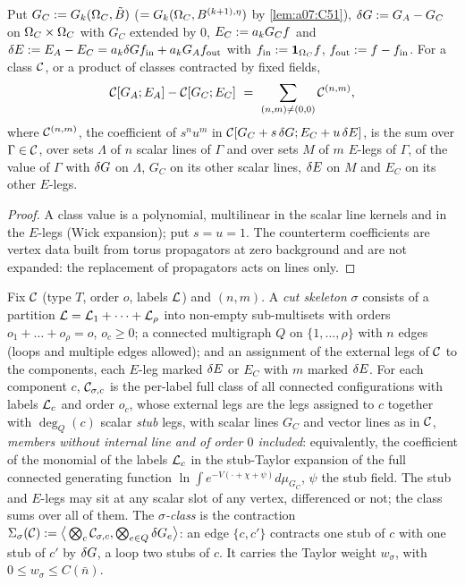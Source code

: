 
\begin{lemma}\label{lem:a07:M}
Put $G_C:= G_k(\Omega_{C},\tilde B)$ ($=G_k(\Omega_{C},B^{(k+1),\eta})$ by \cref{lem:a07:C51}), $\delta G:= G_A-G_C$ on $\Omega_{C}\times\Omega_{C}$ with $G_C$ extended by $0$, $E_C:= a_kG_Cf$ and $\delta E:= E_A-E_C=a_k\delta G f_{\mathrm{in}}+a_kG_Af_{\mathrm{out}}$ with $f_{\mathrm{in}}:=\mathbf 1_{\Omega_{C}}f$, $f_{\mathrm{out}}:= f-f_{\mathrm{in}}$. For a class $\mathcal C$, or a product of classes contracted by fixed fields,
\[
\cC[G_A;E_A]-\cC[G_C;E_C]\ =\ \sum_{(n,m)\ne(0,0)}\cC^{(n,m)},
\]
where $\mathcal C^{(n,m)}$, the coefficient of $s^nu^m$ in $\mathcal C[G_C+s\,\delta G;E_C+u\,\delta E]$, is the sum over $\Gamma\in\mathcal C$, over sets $\Lambda$ of $n$ scalar lines of $\Gamma$ and over sets $M$ of $m$ $E$-legs of $\Gamma$, of the value of $\Gamma$ with $\delta G$ on $\Lambda$, $G_C$ on its other scalar lines, $\delta E$ on $M$ and $E_C$ on its other $E$-legs.
\end{lemma}
\begin{proof}
A class value is a polynomial, multilinear in the scalar line kernels and in the $E$-legs (Wick expansion); put $s=u=1$. The counterterm coefficients are vertex data built from torus propagators at zero background \cite[(1.29)--(1.31)]{Ba3} and are not expanded: the replacement of propagators acts on lines only.
\end{proof}


\begin{definition}\label{def:a07:sigma}
Fix $\mathcal C$ (type $T$, order $o$, labels $\mathcal L$) and $(n,m)$. A \emph{cut skeleton} $\sigma$ consists of a partition $\mathcal L=\mathcal L_1+\dots+\mathcal L_\rho$ into non-empty sub-multisets with orders $o_1+\dots+o_\rho=o$, $o_c\ge0$; a connected multigraph $Q$ on $\{1,\dots,\rho\}$ with $n$ edges (loops and multiple edges allowed); and an assignment of the external legs of $\mathcal C$ to the components, each $E$-leg marked $\delta E$ or $E_C$ with $m$ marked $\delta E$. For each component $c$, $\mathcal C_{\sigma,c}$ is the per-label full class of all connected configurations with labels $\mathcal L_c$ and order $o_c$, whose external legs are the legs assigned to $c$ together with $\deg_Q(c)$ scalar \emph{stub} legs, with scalar lines $G_C$ and vector lines as in $\mathcal C$, \emph{members without internal line and of order $0$ included}: equivalently, the coefficient of the monomial of the labels $\mathcal L_c$ in the stub-Taylor expansion of the full connected generating function $\ln\int e^{-V(\cdot+\chi+\psi)}d\mu_{G_C}$, $\psi$ the stub field. The stub and $E$-legs may sit at any scalar slot of any vertex, differenced or not; the class sums over all of them. The \emph{$\sigma$-class} is the contraction $\Sigma_\sigma(\mathcal C):=\big\langle\bigotimes_c\mathcal C_{\sigma,c},\bigotimes_{e\in Q}\delta G_e\big\rangle$: an edge $\{c,c'\}$ contracts one stub of $c$ with one stub of $c'$ by $\delta G$, a loop two stubs of $c$. It carries the Taylor weight $w_\sigma$, with $0\le w_\sigma\le C(\bar n)$.
\end{definition}

